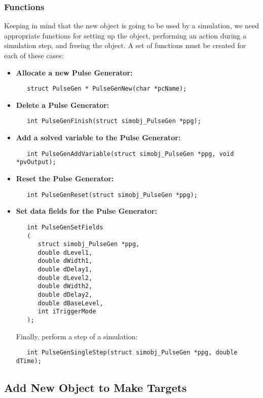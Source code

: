 \documentclass[12pt]{article}
\begin{document}
\subsubsection*{Functions}

Keeping in mind that the new object is going to be used by a simulation, we need appropriate functions for setting up the object, performing an action during a simulation step, and freeing the object. A set of functions must be created for each of these cases:

\begin{itemize}
\item {\bf Allocate a new Pulse Generator:}
\begin{verbatim}
   struct PulseGen * PulseGenNew(char *pcName);
\end{verbatim}

\item {\bf Delete a Pulse Generator:}
\begin{verbatim}
   int PulseGenFinish(struct simobj_PulseGen *ppg);
\end{verbatim}

\item {\bf Add a solved variable to the Pulse Generator:}
\begin{verbatim}
   int PulseGenAddVariable(struct simobj_PulseGen *ppg, void *pvOutput);
\end{verbatim}

\item {\bf Reset the Pulse Generator:}
\begin{verbatim}
   int PulseGenReset(struct simobj_PulseGen *ppg);
\end{verbatim}

\item{\bf Set data fields for the Pulse Generator:}
\begin{verbatim}
   int PulseGenSetFields
   (
      struct simobj_PulseGen *ppg,
      double dLevel1,
      double dWidth1,
      double dDelay1,
      double dLevel2,
      double dWidth2,
      double dDelay2,
      double dBaseLevel,
      int iTriggerMode
   );
\end{verbatim}
Finally, perform a step of a simulation:
\begin{verbatim}
   int PulseGenSingleStep(struct simobj_PulseGen *ppg, double dTime);
\end{verbatim}
\end{itemize}

\subsection*{Add New Object to Make Targets}
\end{document}
